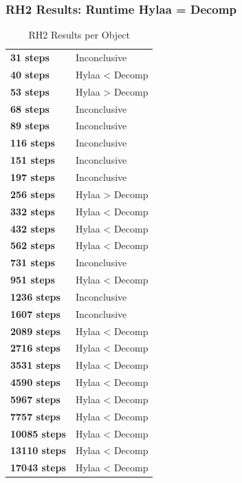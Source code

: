 \documentclass{article}\usepackage[]{graphicx}\usepackage[]{color}
\begin{document}
 

	
	\subsubsection{RH2 Results: Runtime Hylaa = Decomp}
	
	
	\begin{table}[H]
	\centering
	\caption{RH2 Results per Object}
	\begin{tabular}{ll}
	\textbf{31 steps} & Inconclusive \\
	\textbf{40 steps} & Hylaa \textless{} Decomp \\
	\textbf{53 steps} & Hylaa \textgreater{} Decomp \\
	\textbf{68 steps} & Inconclusive \\
	\textbf{89 steps} & Inconclusive \\
	\textbf{116 steps} & Inconclusive \\
	\textbf{151 steps} & Inconclusive \\
	\textbf{197 steps} & Inconclusive \\
	\textbf{256 steps} & Hylaa \textgreater{} Decomp \\
	\textbf{332 steps} & Hylaa \textless{} Decomp \\
	\textbf{432 steps} & Hylaa \textless{} Decomp \\
	\textbf{562 steps} & Hylaa \textless{} Decomp \\
	\textbf{731 steps} & Inconclusive \\
	\textbf{951 steps} & Hylaa \textless{} Decomp \\
	\textbf{1236 steps} & Inconclusive \\
	\textbf{1607 steps} & Inconclusive \\
	\textbf{2089 steps} & Hylaa \textless{} Decomp \\
	\textbf{2716 steps} & Hylaa \textless{} Decomp \\
	\textbf{3531 steps} & Hylaa \textless{} Decomp \\
	\textbf{4590 steps} & Hylaa \textless{} Decomp \\
	\textbf{5967 steps} & Hylaa \textless{} Decomp \\
	\textbf{7757 steps} & Hylaa \textless{} Decomp \\
	\textbf{10085 steps} & Hylaa \textless{} Decomp \\
	\textbf{13110 steps} & Hylaa \textless{} Decomp \\
	\textbf{17043 steps} & Hylaa \textless{} Decomp \\

\end{tabular}
\end{table}
\end{document}
